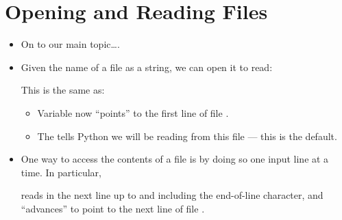 \documentclass[letterpaper,10pt,english]{sphinxmanual}
\begin{document}
\section{Opening and Reading Files}
\label{\detokenize{lecture_notes/lec13_files_web:opening-and-reading-files}}\begin{itemize}
\item {} 
On to our main topic….

\item {} 
Given the name of a file as a string, we can open it to read:

\begin{sphinxVerbatim}[commandchars=\\\{\}]
  
\end{sphinxVerbatim}

This is the same as:

\begin{sphinxVerbatim}[commandchars=\\\{\}]
   
\end{sphinxVerbatim}
\begin{itemize}
\item {} 
Variable  now “points” to the first line of file .

\item {} 
The  tells Python we will be reading from this file — this
is the default.

\end{itemize}

\item {} 
One way to access the contents of a file is by doing so one input line
at a time. In particular,

\begin{sphinxVerbatim}[commandchars=\\\{\}]
  
\end{sphinxVerbatim}

reads in the next line up to and including the end-of-line character,
and “advances”  to point to the next line of file .


\end{itemize}
\end{document}
